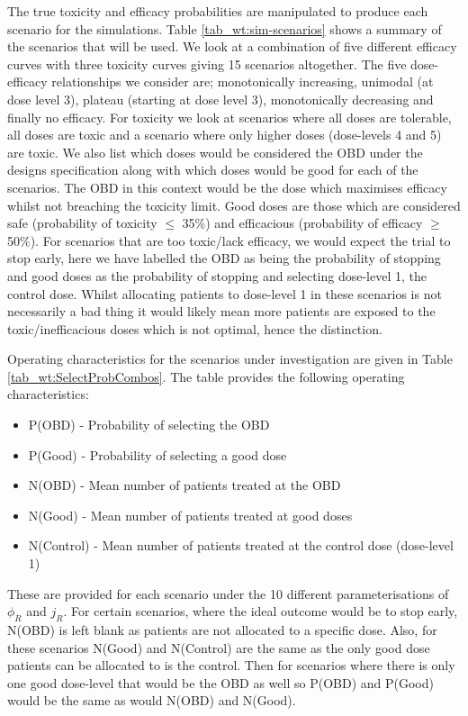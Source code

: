 The true toxicity and efficacy probabilities are manipulated to produce each scenario for the simulations. Table \ref{tab_wt:sim-scenarios} shows a summary of the scenarios that will be used. We look at a combination of five different efficacy curves with three toxicity curves giving 15 scenarios altogether. The five dose-efficacy relationships we consider are; monotonically increasing, unimodal (at dose level 3), plateau (starting at dose level 3), monotonically decreasing and finally no efficacy. For toxicity we look at scenarios where all doses are tolerable, all doses are toxic and a scenario where only higher doses (dose-levels 4 and 5) are toxic. We also list which doses would be considered the OBD under the designs specification along with which doses would be good for each of the scenarios. The OBD in this context would be the dose which maximises efficacy whilst not breaching the toxicity limit. Good doses are those which are considered safe (probability of toxicity $\leq$ 35\%) and efficacious (probability of efficacy $\geq$ 50\%). For scenarios that are too toxic/lack efficacy, we would expect the trial to stop early, here we have labelled the OBD as being the probability of stopping and good doses as the probability of stopping and selecting dose-level 1, the control dose. Whilst allocating patients to dose-level 1 in these scenarios is not necessarily a bad thing it would likely mean more patients are exposed to the toxic/inefficacious doses which is not optimal, hence the distinction.  

Operating characteristics for the scenarios under investigation are given in Table \ref{tab_wt:SelectProbCombos}. The table provides the following operating characteristics: 

\begin{itemize}
	\item P(OBD) - Probability of selecting the OBD
	\item P(Good) - Probability of selecting a good dose
	\item N(OBD) - Mean number of patients treated at the OBD
	\item N(Good) - Mean number of patients treated at good doses
	\item N(Control) - Mean number of patients treated at the control dose (dose-level 1)
\end{itemize}

These are provided for each scenario under the 10 different parameterisations of $\phi_R$ and $j_R$. For certain scenarios, where the ideal outcome would be to stop early, N(OBD) is left blank as patients are not allocated to a specific dose. Also, for these scenarios N(Good) and N(Control) are the same as the only good dose patients can be allocated to is the control. Then for scenarios where there is only one good dose-level that would be the OBD as well so P(OBD) and P(Good) would be the same as would N(OBD) and N(Good). 

